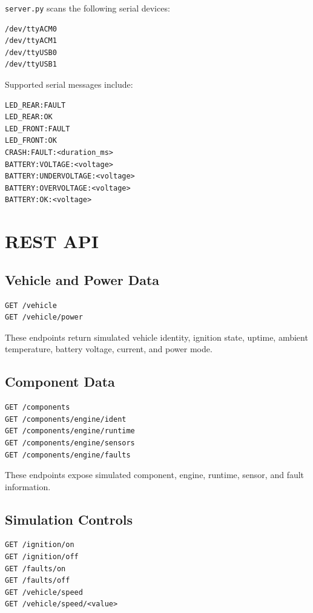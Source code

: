 \documentclass[a4paper,10pt,titlepage,oneside]{article}
\begin{document}
\texttt{server.py} scans the following serial devices:

\begin{lstlisting}
/dev/ttyACM0
/dev/ttyACM1
/dev/ttyUSB0
/dev/ttyUSB1
\end{lstlisting}

Supported serial messages include:

\begin{lstlisting}
LED_REAR:FAULT
LED_REAR:OK
LED_FRONT:FAULT
LED_FRONT:OK
CRASH:FAULT:<duration_ms>
BATTERY:VOLTAGE:<voltage>
BATTERY:UNDERVOLTAGE:<voltage>
BATTERY:OVERVOLTAGE:<voltage>
BATTERY:OK:<voltage>
\end{lstlisting}

\section{REST API}

\subsection{Vehicle and Power Data}

\begin{lstlisting}
GET /vehicle
GET /vehicle/power
\end{lstlisting}

These endpoints return simulated vehicle identity, ignition state, uptime,
ambient temperature, battery voltage, current, and power mode.

\subsection{Component Data}

\begin{lstlisting}
GET /components
GET /components/engine/ident
GET /components/engine/runtime
GET /components/engine/sensors
GET /components/engine/faults
\end{lstlisting}

These endpoints expose simulated component, engine, runtime, sensor, and fault
information.

\subsection{Simulation Controls}

\begin{lstlisting}
GET /ignition/on
GET /ignition/off
GET /faults/on
GET /faults/off
GET /vehicle/speed
GET /vehicle/speed/<value>
\end{lstlisting}
\end{document}
